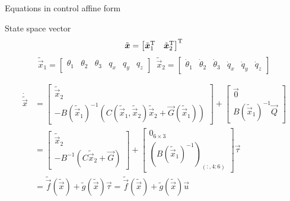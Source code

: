 \begin{frame}{Equations in control affine form}
  \begin{block}{State space vector}
  \[
  \tilde{\boldsymbol{x}} =
  \begin{bmatrix}
    \tilde{\boldsymbol{x}}_1^{\mathrm{T}} & \tilde{\boldsymbol{x}}_2^{\mathrm{T}}
  \end{bmatrix}^{\mathrm{T}}
  \]
  \[
  \tilde{\vec{x}}_1 = 
  \begin{bmatrix}
    \theta_1 & \theta_2 & \theta_3 & q_x & q_y & q_z
  \end{bmatrix}
  \enspace
  \tilde{\vec{x}}_2 = 
  \begin{bmatrix}
    \dot{\theta}_1 & \dot{\theta}_2 & \dot{\theta}_3 & \dot{q}_x & \dot{q}_y & \dot{q}_z
  \end{bmatrix}
  \]
  \end{block}
  \[
  \begin{split}
    \dot{\tilde{\vec{x}}} &= 
    \begin{bmatrix}
      \tilde{\vec{x}}_2 \\
      - B({\tilde{\vec{x}}_1}) ^ {-1} (C(\tilde{\vec{x}}_1, \tilde{\vec{x}}_2) \tilde{\vec{x}}_2 + \vec{G}(\tilde{\vec{x}}_1)) 
    \end{bmatrix} +
    \begin{bmatrix}
      \vec{0} \\
      B({\tilde{\vec{x}}_1}) ^ {-1} \vec{Q}
    \end{bmatrix}\\
    &=\begin{bmatrix}
    \tilde{\vec{x}}_2 \\
    - B^ {-1} (C \tilde{\vec{x}}_2 + \vec{G}) 
    \end{bmatrix} +
    \begin{bmatrix}
      0_{6\times3} \\
      \left(B({\tilde{\vec{x}}_1}) ^ {-1}\right)_{(:, 4:6)}
    \end{bmatrix}\vec{\tau}\\
    &= \tilde{\vec{f}}(\tilde{\vec{x}}) + \tilde{g}(\tilde{\vec{x}}) \vec{\tau}
    = \tilde{\vec{f}}(\tilde{\vec{x}}) + \tilde{g}(\tilde{\vec{x}}) \vec{u}
  \end{split}
  \]
\end{frame}

